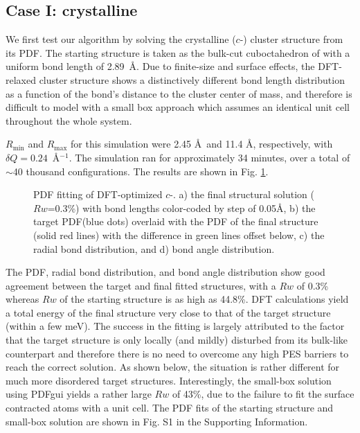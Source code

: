 \subsection{Case I: crystalline }
We first test our algorithm by solving the crystalline  ($c$-) cluster structure from its PDF.
The starting structure is taken as the bulk-cut cuboctahedron of   with a uniform bond length of 2.89~\AA.
Due to finite-size and surface effects, the DFT-relaxed cluster structure shows a distinctively different bond length distribution as a function of the bond's distance to the cluster center of mass, and therefore is difficult to model with a small box approach which assumes an identical unit cell throughout the whole system.

 $R_\mathrm{min}$ and $R_\mathrm{max}$ for this simulation were 2.45 \AA ~and 11.4 \AA, respectively, with $\delta Q=0.24$~\AA$^{-1}$. The simulation ran for approximately 34 minutes, over a total of $\sim$40 thousand configurations.  The results are shown in Fig. \ref{fig:Au55 bulk -> DFT, metrics}.
\begin{figure}
  \def \localimgpath {./Au_55_DFT_HMC_paper_final/55d7ccded2d355710ddb3fdf}
  \centering
  \captionsetup[subfigure]{labelformat=simple}
    \quad
    \quad
    \quad
    \quad

   \caption[ PDF fitting of DFT-optimized $c$-.]{ PDF fitting of DFT-optimized $c$-. a) the final structural solution ($Rw$=0.3\%) with  bond lengths color-coded by step of 0.05\AA, b) the target PDF(blue dots) overlaid with the PDF of the final structure (solid red lines) with the difference in green lines offset below, c) the radial bond distribution, and d) bond angle distribution.  }
         \label{fig:Au55 bulk -> DFT, metrics}
\end{figure}

The PDF, radial bond distribution, and bond angle distribution show good agreement between the target and final fitted structures, with a $Rw$ of 0.3\% whereas $Rw$ of the starting structure is as high as 44.8\%. DFT calculations yield a total energy of the final structure very close to that of the target structure (within a few meV). The success in the fitting is largely attributed to the factor that the target structure is only locally (and mildly) disturbed from its bulk-like counterpart and therefore there is no need to overcome any high PES barriers to reach the correct solution. As shown below, the situation is rather different for much more disordered target structures. Interestingly, the small-box solution using PDFgui\cite{Farrow2007} yields a rather large $Rw$ of 43\%, due to the failure to fit the surface contracted atoms with a unit cell. The PDF fits of the starting structure and small-box solution are shown in Fig. S1 in the Supporting Information.

